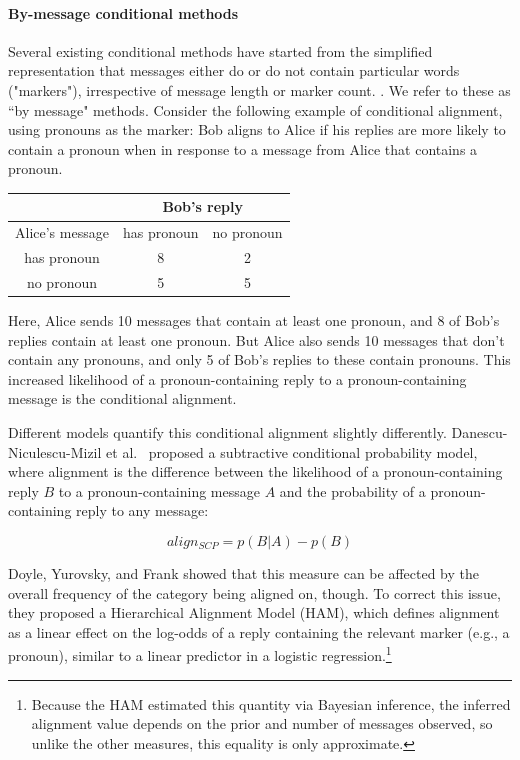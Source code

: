 \documentclass[11pt]{article}
\begin{document}
\paragraph{By-message conditional methods} Several existing conditional methods have started from the simplified representation that messages either do or do not contain particular words ("markers"), irrespective of message length or marker count. \cite{DNMEtAl2012,DoyleYurovskyFrank2016}. We refer to these as ``by message" methods. Consider the following example of conditional alignment, using pronouns as the marker: Bob aligns to Alice if his replies are more likely to contain a pronoun when in response to a message from Alice that contains a pronoun.

\begin{center}
\begin{tabular}{|c||c|c|}
\hline
& \multicolumn{2}{|c|}{Bob's reply} \\
\hline
Alice's message & has pronoun & no pronoun \\ \hline
has pronoun & 8 & 2\\
no pronoun & 5 & 5\\
\hline
\end{tabular}
\end{center}

Here, Alice sends 10 messages that contain at least one pronoun, and 8 of Bob's replies contain at least one pronoun.  But Alice also sends 10 messages that don't contain any pronouns, and only 5 of Bob's replies to these contain pronouns. This increased likelihood of a pronoun-containing reply to a pronoun-containing message is the conditional alignment.

Different models quantify this conditional alignment slightly differently.  Danescu-Niculescu-Mizil et al.~ proposed a subtractive conditional probability model, where alignment is the difference between the likelihood of a pronoun-containing reply $B$ to a pronoun-containing message $A$ and the probability of a pronoun-containing reply to any message:\vspace*{-5pt}

\begin{equation}
align_{SCP} = p(B|A) - p(B)
\end{equation}

Doyle, Yurovsky, and Frank  showed that this measure can be affected by the overall frequency of the category being aligned on, though. To correct this issue, they proposed a Hierarchical Alignment Model (HAM), which defines alignment as a linear effect on the log-odds of a reply containing the relevant marker (e.g., a pronoun), similar to a linear predictor in a logistic regression.\footnote{Because the HAM estimated this quantity via Bayesian inference, the inferred alignment value depends on the prior and number of messages observed, so unlike the other measures, this equality is only approximate.}\vspace*{-5pt}
\end{document}
